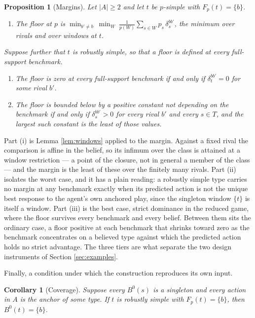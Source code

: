 \documentclass[12pt]{article}
\newtheorem{proposition}{Proposition}
\newtheorem{corollary}{Corollary}
\theoremstyle{definition}
\begin{document}
\begin{proposition}[Margins]\label{prop:margins}
Let $|A| \ge 2$ and let $t$ be $p$-simple with $F_p(t) = \{b\}$.
\begin{enumerate}
\item[i.] The floor at $p$ is $\displaystyle \min_{b' \neq b} \ \min_{W} \ \frac{1}{p(W)} \sum_{s \in W} p_s\, \delta^{bb'}_s$, the minimum over rivals and over windows at $t$.
\end{enumerate}
Suppose further that $t$ is robustly simple, so that a floor is defined at every full-support benchmark.
\begin{enumerate}
\item[ii.] The floor is zero at every full-support benchmark if and only if $\delta^{bb'}_t = 0$ for some rival $b'$.
\item[iii.] The floor is bounded below by a positive constant not depending on the benchmark if and only if $\delta^{bb'}_s > 0$ for every rival $b'$ and every $s \in T$, and the largest such constant is the least of those values.
\end{enumerate}
\end{proposition}

Part (i) is Lemma \ref{lem:windows} applied to the margin. Against a fixed rival the comparison is affine in the belief, so its infimum over the class is attained at a window restriction --- a point of the closure, not in general a member of the class --- and the margin is the least of these over the finitely many rivals. Part (ii) isolates the worst case, and it has a plain reading: a robustly simple type carries no margin at any benchmark exactly when its predicted action is not the unique best response to the agent's own anchored play, since the singleton window $\{t\}$ is itself a window. Part (iii) is the best case, strict dominance in the reduced game, where the floor survives every benchmark and every belief. Between them sits the ordinary case, a floor positive at each benchmark that shrinks toward zero as the benchmark concentrates on a believed type against which the predicted action holds no strict advantage. The three tiers are what separate the two design instruments of Section \ref{sec:examples}.

Finally, a condition under which the construction reproduces its own input.

\begin{corollary}[Coverage]\label{cor:coverage}
Suppose every $B^0(s)$ is a singleton and every action in $A$ is the anchor of some type. If $t$ is robustly simple with $F_p(t) = \{b\}$, then $B^0(t) = \{b\}$.
\end{corollary}
\end{document}
